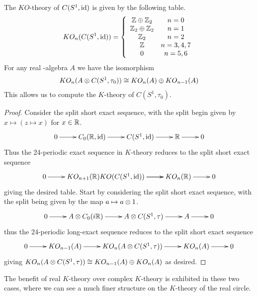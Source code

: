 \begin{theorem}\label{ktheorys1}
	The $KO$-theory of $C(S^1,\operatorname{id})$ is given by the following table. 
	\begin{align*}
		KO_n(C(S^1,\operatorname{id}))=\left \{ \begin{array}{c c} \mathbb{Z}\oplus \mathbb{Z}_2 & n=0 \\ \mathbb{Z}_2\oplus \mathbb{Z}_2 & n=1 \\ \mathbb{Z}_2 & n=2 \\ \mathbb{Z} & n=3,4,7 \\ 0 & n=5,6 \end{array} \right .
	\end{align*}
	For any real \Cstar-algebra $A$ we have the isomorphism 
	\begin{align*}
		KO_n(A\otimes C(S^1,\tau_0))\cong KO_n(A)\oplus KO_{n-1}(A)
	\end{align*}
	This allows us to compute the $K$-theory of $C(S^1,\tau_0)$.
\end{theorem}
\begin{proof}
	Consider the split short exact sequence, with the split begin given by $x \mapsto (z\mapsto x)$ for $x\in \mathbb{R}$. 
	\begin{align*}
		\xymatrix{
			0\ar[r] & C_0(\R,\id) \ar[r] & C(S^1,\id) \ar[r] & \R \ar[r] & 0 
		}
	\end{align*}
	Thus the 24-periodic exact sequence in $K$-theory reduces to the split short exact sequence 
	\begin{align*}
	\xymatrix{
		0 \ar[r] & KO_{n+1}(\R) \ar[r] KO(C(S^1,\id)) \ar[r] & KO_n(\R) \ar[r] & 0
		}
	\end{align*}
	giving the desired table. 
	Start by considering the split short exact sequence, with the split being given by the map $a\mapsto a\otimes 1$.
	\begin{align*}
	\xymatrix{
		0\ar[r] & A\tens C_0(i\R) \ar[r] & A\tens C(S^1,\tau) \ar[r] & A \ar[r] & 0
		}
	\end{align*}
	thus the 24-periodic long-exact sequence reduces to the split short exact sequence
	\begin{align*}
		\xymatrix{
			0\ar[r] & KO_{n-1}(A) \ar[r] & KO_n(A\tens C(S^1,\tau)) \ar[r] & KO_n(A) \ar[r] & 0
		}
	\end{align*}
	giving $KO_n(A\otimes C(S^1,\tau))\cong  KO_{n-1}(A)\oplus  KO_n(A)$ as desired. 
\end{proof}
The benefit of real $K$-theory over complex $K$-theory is exhibited in these two cases, where we can see a much finer structure on the $K$-theory of the real circle. %

